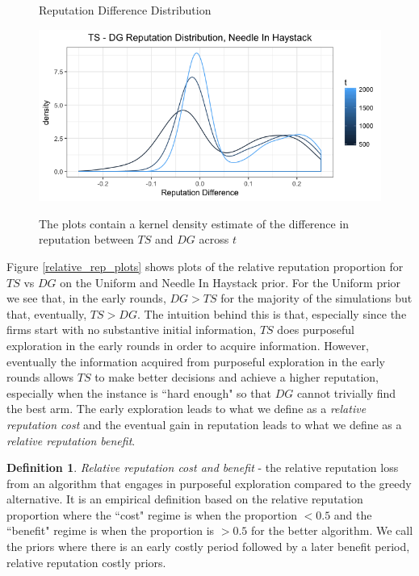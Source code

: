 \documentclass{article}
\theoremstyle{definition}
\newtheorem{definition}{Definition}
\begin{document}
\begin{figure}
\caption{Reputation Difference Distribution}
\includegraphics[scale=0.35]{figures/ts_dg_rep_diff_nih}
\label{ts_dg_rep_diff_nih}
\caption*{\tiny{The plots contain a kernel density estimate of the difference in reputation between $TS$ and $DG$ across $t$}}
\end{figure}

Figure \ref{relative_rep_plots} shows plots of the relative reputation proportion for $TS$ vs $DG$ on the Uniform and Needle In Haystack prior. For the Uniform prior we see that, in the early rounds, $DG > TS$ for the majority of the simulations but that, eventually, $TS > DG$. The intuition behind this is that, especially since the firms start with no substantive initial information, $TS$ does purposeful exploration in the early rounds in order to acquire information. However, eventually the information acquired from purposeful exploration in the early rounds allows $TS$ to make better decisions and achieve a higher reputation, especially when the instance is ``hard enough" so that $DG$ cannot trivially find the best arm. The early exploration leads to what we define as a \textit{relative reputation cost} and the eventual gain in reputation leads to what we define as a \textit{relative reputation benefit}.

\begin{definition}
\textit{Relative reputation cost and benefit} - the relative reputation loss from an algorithm that engages in purposeful exploration compared to the greedy alternative. It is an empirical definition based on the relative reputation proportion where the ``cost" regime is when the proportion $< 0.5$ and the ``benefit" regime is when the proportion is $> 0.5$ for the better algorithm. We call the priors where there is an early costly period followed by a later benefit period, relative reputation costly priors.
\end{definition}
\end{document}
